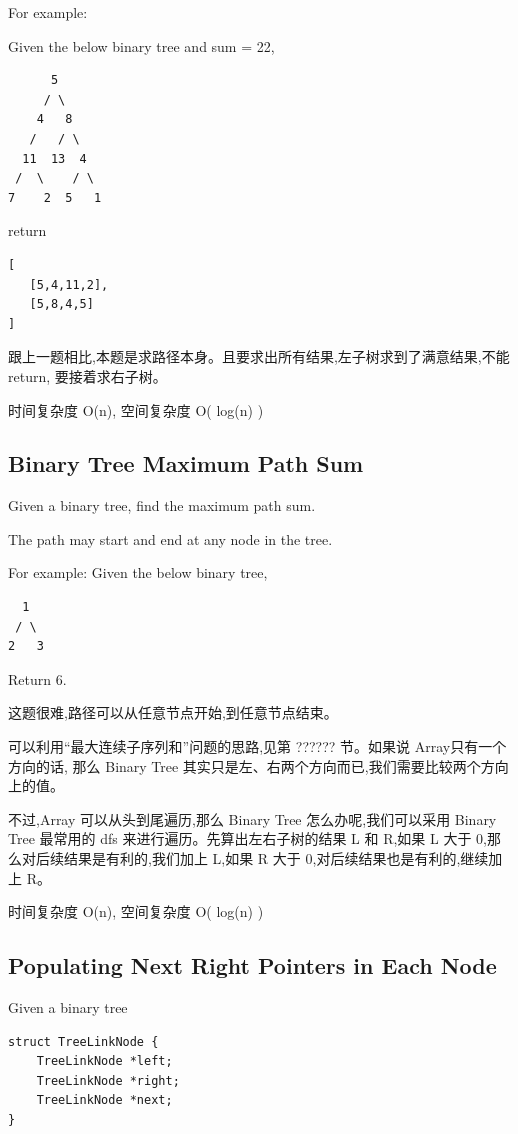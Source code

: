 \documentclass[12pt]{book}
\begin{document}
For example:

Given the below binary tree and sum = 22,
\lstset{language=java,label= ,caption= ,numbers=none}
\begin{lstlisting}
      5
     / \
    4   8
   /   / \
  11  13  4
 /  \    / \
7    2  5   1
\end{lstlisting}

return
\lstset{language=java,label= ,caption= ,numbers=none}
\begin{lstlisting}
[
   [5,4,11,2],
   [5,8,4,5]
]
\end{lstlisting}

跟上一题相比,本题是求路径本身。且要求出所有结果,左子树求到了满意结果,不能 return, 要接着求右子树。

时间复杂度 O(n), 空间复杂度 O( log(n) )

\subsection{Binary Tree Maximum Path Sum}
\label{sec-4-4-5}
Given a binary tree, find the maximum path sum.

The path may start and end at any node in the tree.

For example:
Given the below binary tree,
\lstset{language=java,label= ,caption= ,numbers=none}
\begin{lstlisting}
  1
 / \
2   3
\end{lstlisting}

Return 6.

这题很难,路径可以从任意节点开始,到任意节点结束。

可以利用“最大连续子序列和”问题的思路,见第 ?????? 节。如果说 Array只有一个方向的话, 那么 Binary Tree 其实只是左、右两个方向而已,我们需要比较两个方向上的值。

不过,Array 可以从头到尾遍历,那么 Binary Tree 怎么办呢,我们可以采用 Binary Tree 最常用的 dfs 来进行遍历。先算出左右子树的结果 L 和 R,如果 L 大于 0,那么对后续结果是有利的,我们加上 L,如果 R 大于 0,对后续结果也是有利的,继续加上 R。

时间复杂度 O(n), 空间复杂度 O( log(n) )

\subsection{Populating Next Right Pointers in Each Node}
\label{sec-4-4-6}
Given a binary tree
\lstset{language=java,label= ,caption= ,numbers=none}
\begin{lstlisting}
struct TreeLinkNode {
    TreeLinkNode *left;
    TreeLinkNode *right;
    TreeLinkNode *next;
}
\end{lstlisting}
\end{document}
